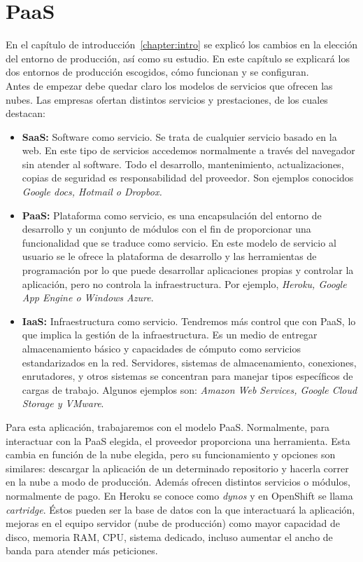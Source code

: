 
\section{PaaS}\label{cap.3.1}

En el capítulo de introducción~\ref{chapter:intro} se explicó los cambios en la elección del entorno de producción, así como su estudio. En este capítulo se explicará los dos entornos de producción escogidos, cómo funcionan y se configuran. \\

Antes de empezar debe quedar claro los modelos de servicios que ofrecen las nubes. Las empresas ofertan distintos servicios y prestaciones, de los cuales destacan:
\begin{itemize}
	\item \textbf{SaaS:} Software como servicio. Se trata de cualquier servicio basado en la web. En este tipo de servicios accedemos normalmente a través del navegador sin atender al software. Todo el desarrollo, mantenimiento, actualizaciones, copias de seguridad es responsabilidad del proveedor. Son ejemplos conocidos \emph{Google docs, Hotmail o Dropbox.}
	\item \textbf{PaaS:} Plataforma como servicio, es una encapsulación del entorno de desarrollo y un conjunto de módulos con el fin de proporcionar una funcionalidad que se traduce como servicio. En este modelo de servicio al usuario se le ofrece la plataforma de desarrollo y las herramientas de programación por lo que puede desarrollar aplicaciones propias y controlar la aplicación, pero no controla la infraestructura. Por ejemplo, \emph{Heroku, Google App Engine o Windows Azure}. 
	\item \textbf{IaaS:} Infraestructura como servicio. Tendremos más control que con PaaS, lo que implica la gestión de la infraestructura. Es un medio de entregar almacenamiento básico y capacidades de cómputo como servicios estandarizados en la red. Servidores, sistemas de almacenamiento, conexiones, enrutadores, y otros sistemas se concentran para manejar tipos específicos de cargas de trabajo. Algunos ejemplos son: \emph{Amazon Web Services, Google Cloud Storage y VMware}. 
\end{itemize}

Para esta aplicación, trabajaremos con el modelo PaaS. Normalmente, para interactuar con la PaaS elegida, el proveedor proporciona una herramienta. Esta cambia en función de la nube elegida, pero su funcionamiento y opciones son similares: descargar la aplicación de un determinado repositorio y hacerla correr en la nube a modo de producción. Además ofrecen distintos servicios o módulos, normalmente de pago. En Heroku se conoce como \emph{dynos} y en OpenShift se llama \emph{cartridge}. Éstos pueden ser la base de datos con la que interactuará la aplicación, mejoras en el equipo servidor (nube de producción) como mayor capacidad de disco, memoria RAM, CPU, sistema dedicado, incluso aumentar el ancho de banda para atender más peticiones.

